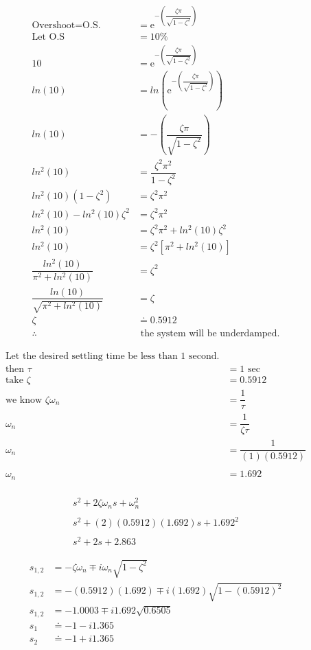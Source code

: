 \documentclass[12pt]{report}
\begin{document}
\begin{align}
\text{Overshoot} = \text{O.S.} &= \mathrm{e}^{-\left(\dfrac{\zeta\pi}{\sqrt{1 - \zeta^{2}}}\right)}\\
\text{Let O.S} &= 10\%\\
10 &= \mathrm{e}^{-\left(\dfrac{\zeta\pi}{\sqrt{1 - \zeta^{2}}}\right)}\\
ln(10) &= ln\left(\mathrm{e}^{-\left(\dfrac{\zeta\pi}{\sqrt{1 - \zeta^{2}}}\right)}\right)\\
ln(10) &= -\left(\dfrac{\zeta\pi}{\sqrt{1 - \zeta^{2}}}\right)\\
ln^{2}(10) &= \dfrac{\zeta^{2}\pi^{2}}{1 - \zeta^{2}}\\
ln^{2}(10)(1 - \zeta^{2}) &= \zeta^{2}\pi^{2}\\
ln^{2}(10)- ln^{2}(10)\zeta^{2} &= \zeta^{2}\pi^{2}\\
ln^{2}(10) &= \zeta^{2}\pi^{2} + ln^{2}(10)\zeta^{2}\\
ln^{2}(10) &= \zeta^{2}[\pi^{2} + ln^{2}(10)]\\
\dfrac{ln^{2}(10)}{\pi^{2} + ln^{2}(10)} &= \zeta^{2}\\
\dfrac{ln(10)}{\sqrt{\pi^{2} + ln^{2}(10)}} &= \zeta\\
\zeta &\doteq 0.5912\\\nonumber
\therefore &\text{ the system will be underdamped.}
\end{align}

\begin{align}
\nonumber
\text{Let the desired settling time be less than 1 second.}\\\nonumber
\text{then }\tau &= 1 \text{ sec}\\\nonumber
\text{take }\zeta &= 0.5912\\
\text{we know }\zeta\omega_{n} &= \dfrac{1}{\tau}\\
\omega_{n} &= \dfrac{1}{\zeta\tau}\\
\omega_{n} &= \dfrac{1}{(1)(0.5912)}\\\nonumber
\\
\omega_{n} &= 1.692\\\nonumber
\end{align}

\begin{align}
s^{2} + 2\zeta\omega_{n}s + \omega_{n}^{2}\\\nonumber
\\
s^{2} + (2)(0.5912)(1.692)s + 1.692^{2}\\\nonumber
\\
s^{2} + 2s + 2.863
\end{align}

\begin{align}
s_{1,2} &= -\zeta\omega_{n} \mp i\omega_{n}\sqrt{1 - \zeta^{2}}\\
s_{1,2} &= -(0.5912)(1.692) \mp i(1.692)\sqrt{1-(0.5912)^{2}}\\
s_{1,2} &= -1.0003 \mp i1.692\sqrt{0.6505}\\
s_{1} &\doteq -1 - i1.365\\
s_{2} &\doteq -1 + i1.365
\end{align}
\end{document}
